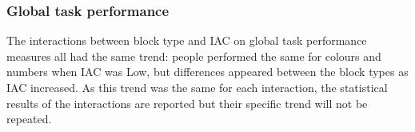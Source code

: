 \subsubsection{Global task performance}
The interactions between block type and IAC on global task performance measures all had the same trend: people performed the same for colours and numbers when IAC was Low, but differences appeared between the block types as IAC increased. As this trend was the same for each interaction, the statistical results of the interactions are reported but their specific trend will not be repeated.

